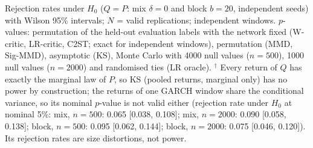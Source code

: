 Rejection rates under $H_0$ ($Q=P$: mix $\delta=0$ and block $b=20$, independent seeds) with Wilson 95\% intervals; $N$ = valid replications; independent windows.
$p$-values: permutation of the held-out evaluation labels with the network fixed (W-critic, LR-critic, C2ST; exact for independent windows), permutation (MMD, Sig-MMD), asymptotic (KS), Monte Carlo with 4000 null values ($n=500$), 1000 null values ($n=2000$) and randomised ties (LR oracle).
$^{\dagger}$ Every return of $Q$ has exactly the marginal law of $P$, so KS (pooled returns, marginal only) has no power by construction; the returns of one GARCH window share the conditional variance, so its nominal $p$-value is not valid either (rejection rate under $H_0$ at nominal 5\%: mix, $n=500$: 0.065 [0.038, 0.108]; mix, $n=2000$: 0.090 [0.058, 0.138]; block, $n=500$: 0.095 [0.062, 0.144]; block, $n=2000$: 0.075 [0.046, 0.120]). Its rejection rates are size distortions, not power.
